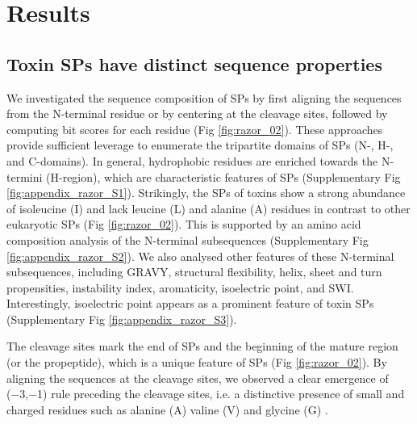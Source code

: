 \section{Results}
\subsection{Toxin SPs have distinct sequence properties}
We investigated the sequence composition of SPs by first aligning the sequences from the N-terminal residue or by centering at the cleavage sites, followed by computing bit scores for each residue (Fig  \ref{fig:razor_02}). These approaches provide sufficient leverage to enumerate the tripartite domains of SPs (N-, H-, and C-domains). In general, hydrophobic residues are enriched towards the N-termini (H-region), which are characteristic features of SPs \cite{Von_Heijne1990-sb} (Supplementary Fig \ref{fig:appendix_razor_S1}). Strikingly, the SPs of toxins show a strong abundance of isoleucine (I) and lack leucine (L) and alanine (A) residues in contrast to other eukaryotic SPs (Fig \ref{fig:razor_02}). This is supported by an amino acid composition analysis of the N-terminal subsequences (Supplementary Fig \ref{fig:appendix_razor_S2}). We also analysed other features of these N-terminal subsequences, including GRAVY, structural flexibility, helix, sheet and turn propensities, instability index, aromaticity, isoelectric point, and SWI. Interestingly, isoelectric point appears as a prominent feature of toxin SPs (Supplementary Fig \ref{fig:appendix_razor_S3}).


The cleavage sites mark the end of SPs and the beginning of the mature region (or the propeptide), which is a unique feature of SPs (Fig \ref{fig:razor_02}). By aligning the sequences at the cleavage sites, we observed a clear emergence of (−3,−1) rule preceding the cleavage sites, i.e. a distinctive presence of small and charged residues such as alanine (A) valine (V) and glycine (G) \cite{Von_Heijne1983-hr}.

